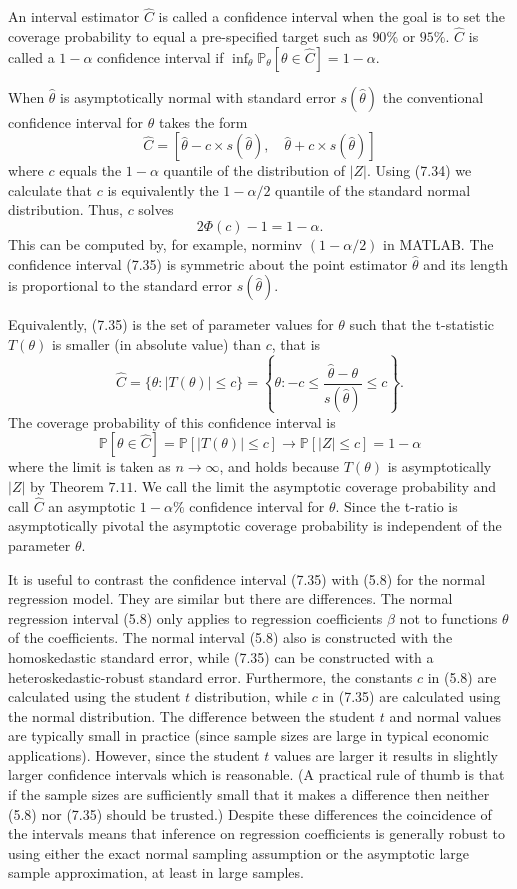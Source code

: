 \documentclass[10pt]{article}
\begin{document}
An interval estimator $\widehat{C}$ is called a confidence interval when the goal is to set the coverage probability to equal a pre-specified target such as $90 \%$ or $95 \%$. $\widehat{C}$ is called a $1-\alpha$ confidence interval if $\inf _{\theta} \mathbb{P}_{\theta}[\theta \in \widehat{C}]=1-\alpha$.

When $\widehat{\theta}$ is asymptotically normal with standard error $s(\widehat{\theta})$ the conventional confidence interval for $\theta$ takes the form
$$
\widehat{C}=[\widehat{\theta}-c \times s(\widehat{\theta}), \quad \widehat{\theta}+c \times s(\widehat{\theta})]
$$
where $c$ equals the $1-\alpha$ quantile of the distribution of $|Z|$. Using (7.34) we calculate that $c$ is equivalently the $1-\alpha / 2$ quantile of the standard normal distribution. Thus, $c$ solves
$$
2 \Phi(c)-1=1-\alpha .
$$
This can be computed by, for example, norminv $(1-\alpha / 2)$ in MATLAB. The confidence interval (7.35) is symmetric about the point estimator $\widehat{\theta}$ and its length is proportional to the standard error $s(\widehat{\theta})$.

Equivalently, (7.35) is the set of parameter values for $\theta$ such that the t-statistic $T(\theta)$ is smaller (in absolute value) than $c$, that is
$$
\widehat{C}=\{\theta:|T(\theta)| \leq c\}=\left\{\theta:-c \leq \frac{\widehat{\theta}-\theta}{s(\widehat{\theta})} \leq c\right\} .
$$
The coverage probability of this confidence interval is
$$
\mathbb{P}[\theta \in \widehat{C}]=\mathbb{P}[|T(\theta)| \leq c] \rightarrow \mathbb{P}[|Z| \leq c]=1-\alpha
$$
where the limit is taken as $n \rightarrow \infty$, and holds because $T(\theta)$ is asymptotically $|Z|$ by Theorem $7.11$. We call the limit the asymptotic coverage probability and call $\widehat{C}$ an asymptotic $1-\alpha \%$ confidence interval for $\theta$. Since the t-ratio is asymptotically pivotal the asymptotic coverage probability is independent of the parameter $\theta$.

It is useful to contrast the confidence interval (7.35) with (5.8) for the normal regression model. They are similar but there are differences. The normal regression interval (5.8) only applies to regression coefficients $\beta$ not to functions $\theta$ of the coefficients. The normal interval (5.8) also is constructed with the homoskedastic standard error, while (7.35) can be constructed with a heteroskedastic-robust standard error. Furthermore, the constants $c$ in (5.8) are calculated using the student $t$ distribution, while $c$ in (7.35) are calculated using the normal distribution. The difference between the student $t$ and normal values are typically small in practice (since sample sizes are large in typical economic applications). However, since the student $t$ values are larger it results in slightly larger confidence intervals which is reasonable. (A practical rule of thumb is that if the sample sizes are sufficiently small that it makes a difference then neither (5.8) nor (7.35) should be trusted.) Despite these differences the coincidence of the intervals means that inference on regression coefficients is generally robust to using either the exact normal sampling assumption or the asymptotic large sample approximation, at least in large samples.
\end{document}
